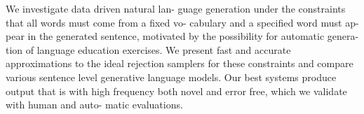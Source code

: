We investigate data driven natural lan- guage generation under the constraints that all words must come from a fixed vo- cabulary and a specified word must ap- pear in the generated sentence, motivated by the possibility for automatic genera- tion of language education exercises. We present fast and accurate approximations to the ideal rejection samplers for these constraints and compare various sentence level generative language models. Our best systems produce output that is with high frequency both novel and error free, which we validate with human and auto- matic evaluations.
